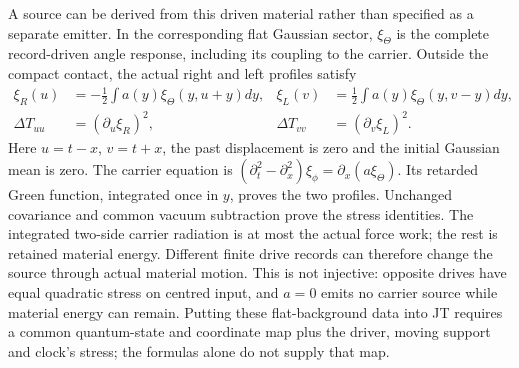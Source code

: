 \documentclass[12pt,a4paper]{article}
\begin{document}
A source can be derived from this driven material rather than specified
as a separate emitter. In the corresponding flat Gaussian sector,
$\xi_\Theta$ is the complete record-driven angle response, including
its coupling to the carrier. Outside the compact contact, the actual
right and left profiles satisfy
\begin{align}
 \xi_R(u)&=-\frac12\int a(y)\xi_\Theta(y,u+y)dy,
 &\xi_L(v)&=\frac12\int a(y)\xi_\Theta(y,v-y)dy,\nonumber\\
 \Delta T_{uu}&=(\partial_u\xi_R)^2,
 &\Delta T_{vv}&=(\partial_v\xi_L)^2.
 \label{eq:material-emitted-source}
\end{align}
Here $u=t-x$, $v=t+x$, the past displacement is zero and the
initial Gaussian mean is zero. The carrier equation is
$(\partial_t^2-\partial_x^2)\xi_\phi=\partial_x(a\xi_\Theta)$.
Its retarded Green function, integrated once in $y$, proves the two
profiles. Unchanged covariance and common vacuum subtraction prove the
stress identities. The integrated two-side carrier radiation is at
most the actual force work; the rest is retained material energy.
Different finite drive records can therefore change the source through
actual material motion. This is not injective: opposite drives have
equal quadratic stress on centred input, and $a=0$ emits no carrier
source while material energy can remain. Putting these flat-background
data into JT requires a common quantum-state and coordinate map plus
the driver, moving support and clock's stress; the formulas alone do
not supply that map.
\end{document}

